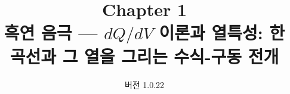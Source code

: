 
\renewcommand{\theequation}{1.\arabic{equation}}
\renewcommand{\thesection}{1.\arabic{section}}

\title{\textbf{\LARGE Chapter 1}\\[0.35em]\Large 흑연 음극 --- $dQ/dV$ 이론과 열특성: 한 곡선과 그 열을 그리는 수식-구동 전개}
\author{}
\date{\normalsize 버전 1.0.22}


\maketitle
































